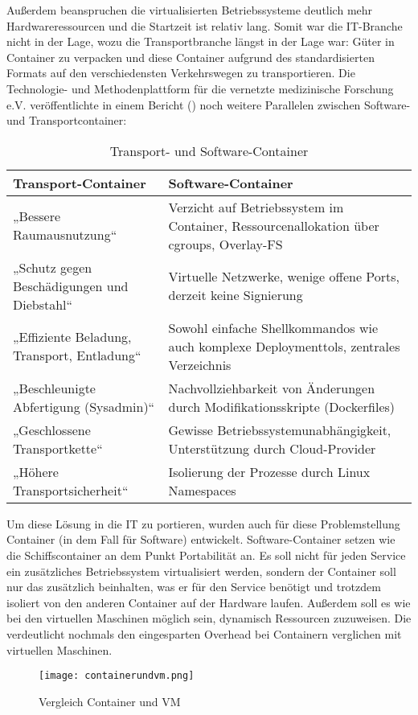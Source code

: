 Außerdem beanspruchen die virtualisierten Betriebssysteme deutlich mehr Hardwareressourcen und die Startzeit ist relativ lang.
Somit war die IT-Branche nicht in der Lage, wozu die Transportbranche längst in der Lage war: Güter in Container zu verpacken und diese Container aufgrund des standardisierten Formats auf den verschiedensten Verkehrswegen zu transportieren. Die Technologie- und Methodenplattform für die vernetzte medizinische Forschung e.V. veröffentlichte in einem Bericht (\cite{TUM}) noch weitere Parallelen zwischen Software- und Transportcontainer:
\begin{table}[h]
\def\arraystretch{1.5}%
\begin{tabular}{|p{}|p{}|}\hline
	\textbf{Transport-Container} & \textbf{Software-Container} \\ \hline
	„Bessere Raumausnutzung“ & Verzicht auf Betriebssystem im Container, Ressourcenallokation über cgroups, Overlay-FS \\ \hline
	„Schutz gegen Beschädigungen und Diebstahl“ & Virtuelle Netzwerke, wenige offene Ports, derzeit keine Signierung \\ \hline
	„Effiziente Beladung, Transport, Entladung“ & Sowohl einfache Shellkommandos wie auch komplexe Deploymenttols, zentrales Verzeichnis \\ \hline
	„Beschleunigte Abfertigung (Sysadmin)“ & Nachvollziehbarkeit von Änderungen durch Modifikationsskripte (Dockerfiles) \\ \hline
	„Geschlossene Transportkette“ &Gewisse Betriebssystemunabhängigkeit, Unterstützung durch Cloud-Provider \\ \hline
	„Höhere Transportsicherheit“ & Isolierung der Prozesse durch Linux Namespaces \\ \hline
\end{tabular}
\caption{Transport- und Software-Container}
\end{table}

Um diese Lösung in die IT zu portieren, wurden auch für diese Problemstellung Container (in dem Fall für Software) entwickelt.
Software-Container setzen wie die Schiffscontainer an dem Punkt Portabilität an.
Es soll nicht für jeden Service ein zusätzliches Betriebssystem virtualisiert werden, sondern der Container soll nur das zusätzlich beinhalten, was er für den Service benötigt und trotzdem isoliert von den anderen Container auf der Hardware laufen.
Außerdem soll es wie bei den virtuellen Maschinen möglich sein, dynamisch Ressourcen zuzuweisen.\cite{12005068320161201, redhat}
Die  verdeutlicht nochmals den eingesparten Overhead bei Containern verglichen mit virtuellen Maschinen.
\begin{figure}[H]
	\begin{center}
		\texttt{[image: containerundvm.png]}
	\end{center}
	\caption[Vergleich Container und VM]{Vergleich Container und VM \footnotemark}
	\label{fig:VergleichContainerVM}
\end{figure}
\newpage


